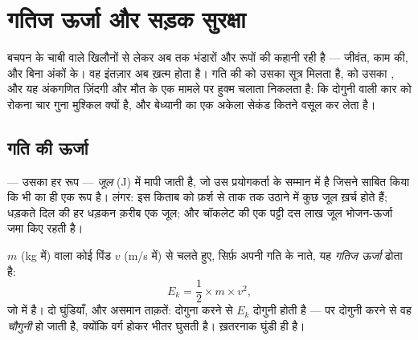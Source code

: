 \chapter{गतिज ऊर्जा और सड़क सुरक्षा}\label{ch:g9:kinetic-energy-safety}

बचपन के चाबी वाले खिलौनों से लेकर अब तक  भंडारों और रूपों की
कहानी रही है --- जीवंत, काम की, और बिना अंकों के। वह इंतज़ार अब ख़त्म
होता है। गति की  को उसका सूत्र मिलता है,  को उसका ,
और यह अंकगणित ज़िंदगी और मौत के एक मामले पर हुक्म चलाता निकलता है: कि
दोगुनी  वाली कार को रोकना चार गुना मुश्किल क्यों है, और बेध्यानी का
एक अकेला सेकंड कितने  वसूल कर लेता है।

\section{गति की ऊर्जा}

\begin{definition}[जूल]\label{def:g9:kinetic-energy-safety:joule}
 --- उसका हर रूप --- \emph{जूल} (\unit{J}) में मापी
जाती है, जो उस प्रयोगकर्ता के सम्मान में है जिसने साबित किया कि 
भी  का ही एक रूप है। लंगर: इस किताब को फ़र्श से ताक तक उठाने में
कुछ जूल ख़र्च होते हैं; धड़कते दिल की हर धड़कन क़रीब एक जूल; और
चॉकलेट की एक पट्टी दस लाख जूल भोजन-ऊर्जा जमा किए रहती है।
\end{definition}

\begin{proposition}[गतिज ऊर्जा]\label{prop:g9:kinetic-energy-safety:formula}
$m$  (\unit{kg} में) वाला कोई पिंड $v$  (\unit{m/s} में)
से चलते हुए, सिर्फ़ अपनी गति के नाते, यह \emph{गतिज ऊर्जा} ढोता है:
\[
E_k = \frac{1}{2} \times m \times v^2 ,
\]
जो  में है। दो घुंडियाँ, और असमान ताक़तें:  दोगुना करने से
$E_k$ दोगुनी होती है --- पर \emph{} दोगुनी करने से वह
\emph{चौगुनी} हो जाती है, क्योंकि  वर्ग होकर भीतर घुसती है। ख़तरनाक
घुंडी  ही है।
\end{proposition}

